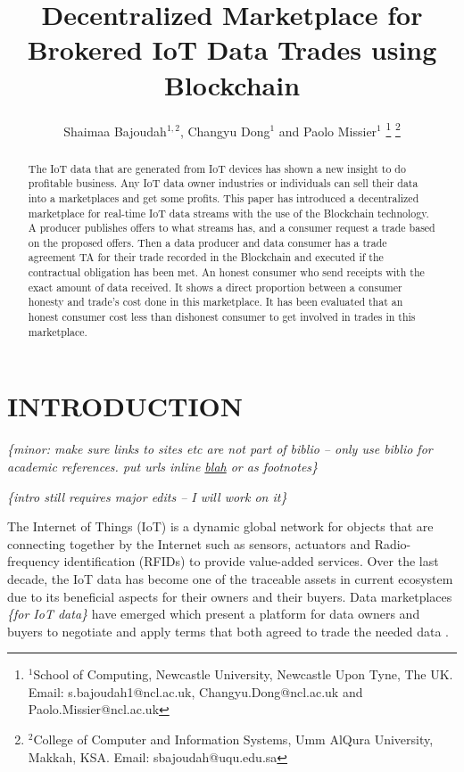 \documentclass[letterpaper, 10 pt, conference]{ieeeconf}  %
\title{\LARGE \bf
Decentralized Marketplace for Brokered IoT Data Trades using Blockchain
}
\author{Shaimaa Bajoudah$^{1,2}$, Changyu Dong$^{1}$ and Paolo Missier$^{1}$%
\thanks{$^{1}$School of Computing, Newcastle University, Newcastle Upon Tyne, The UK.
         Email: s.bajoudah1@ncl.ac.uk, Changyu.Dong@ncl.ac.uk and Paolo.Missier@ncl.ac.uk}%
\thanks{$^{2}$College of Computer and Information Systems, Umm AlQura University, Makkah, KSA. Email: sbajoudah@uqu.edu.sa}%
}
\newcommand{\anote}[1]{{\leavevmode\smaller\itshape\color{red}\{#1\}}}
\begin{document}
\maketitle
\thispagestyle{empty}
\pagestyle{empty}


\begin{abstract}

The IoT data that are generated from IoT devices has shown a new insight to do profitable business. Any IoT data owner industries or individuals can sell their data into a marketplaces and get some profits. This paper has introduced a decentralized marketplace for real-time IoT data streams with the use of the Blockchain technology. A producer publishes offers to what streams has, and a consumer request a trade based on the proposed offers. Then a data producer and data consumer has a trade agreement  TA for their trade recorded in the Blockchain and executed if the contractual obligation has been met. An honest consumer who send receipts with the exact amount of data received. It shows a direct proportion between a consumer honesty and trade's cost done in this marketplace. It has been evaluated that an honest consumer cost less than dishonest consumer to get involved in trades in this marketplace. 

\end{abstract}


\section{INTRODUCTION}

\anote{minor: make sure links to sites etc are not part of biblio -- only use biblio for academic references.  put urls inline \url{blah} or as footnotes}

\anote{intro still requires major edits -- I will work on it}

The Internet of Things (IoT) is a dynamic global network for objects that are connecting together by the Internet such as sensors, actuators and Radio-frequency identification (RFIDs) to provide value-added services. Over the last decade, the IoT data has become one of the traceable assets in current ecosystem due to its beneficial aspects for their owners and their buyers. Data marketplaces \anote{for IoT data} have emerged which present a platform for data owners and buyers to negotiate and apply terms that both agreed to trade the needed data \cite{misura}.
\end{document}
